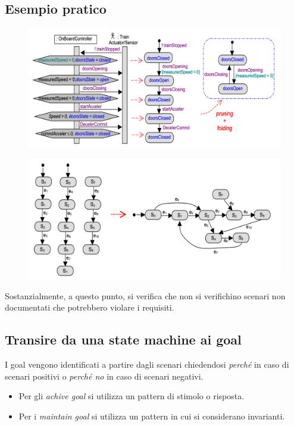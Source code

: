 \subsection{Esempio pratico}
\begin{figure}[H]
    \centering
    \includegraphics[scale=0.4]{img/da_scenari_a_state.png}
\end{figure}
\begin{figure}[H]
    \centering
    \includegraphics[scale=0.4]{img/merge_state.png}
\end{figure}
Sostanzialmente, a questo punto, si verifica che non si verifichino 
scenari non documentati che potrebbero violare i requisiti.

\subsection{Transire da una state machine ai goal}
I goal vengono identificati a partire dagli scenari chiedendosi \textit{perché} in 
caso di scenari positivi o 
\textit{perché no} in caso di scenari negativi.

\begin{itemize}
    \item Per gli \textit{achive goal} si utilizza un pattern di 
    stimolo o risposta.
    \item Per i \textit{maintain goal} si utilizza un pattern in 
    cui si considerano invarianti.
\end{itemize}

